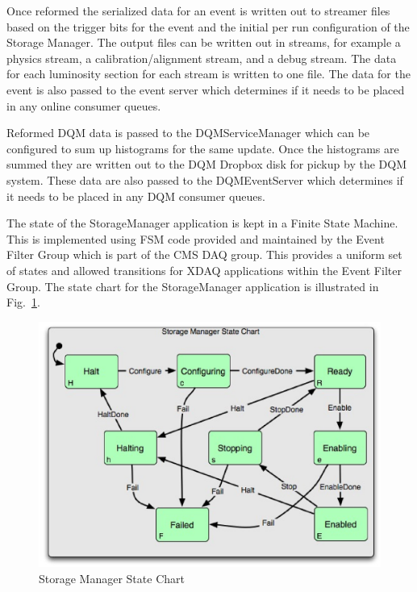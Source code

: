 \begin{itemize}
Once reformed the serialized data for an event is written out to streamer files based
on the trigger bits for the event and the initial per run configuration of the Storage Manager.
The output files can be written out in streams, for example a physics stream, a
calibration/alignment stream, and a debug stream. The data for each luminosity section
for each stream is written to one file. The data for the event is also passed to the
event server which determines if it needs to be placed in any online consumer queues.

Reformed DQM data is passed to the DQMServiceManager which can be configured to sum up
histograms for the same update. Once the histograms are summed they are written out to
the DQM Dropbox disk for pickup by the DQM system. These data are also passed to the
DQMEventServer which determines if it needs to be placed in any DQM consumer queues.
\end{itemize}

The state of the StorageManager application is kept in a Finite State Machine. This
is implemented using FSM code provided and maintained by the Event Filter Group
which is part of the CMS DAQ group. This provides a uniform set of states and
allowed transitions for XDAQ applications within the Event Filter Group. The
state chart for the StorageManager application is illustrated in Fig.~\ref{fig:sm_fsm_chart}.

\begin{figure}[hbtp]
  \begin{center}
    \includegraphics[width=4.5in]{Software/sm_fsm_chart.eps}
    \caption{Storage Manager State Chart}
    \label{fig:sm_fsm_chart}
  \end{center}
\end{figure}

